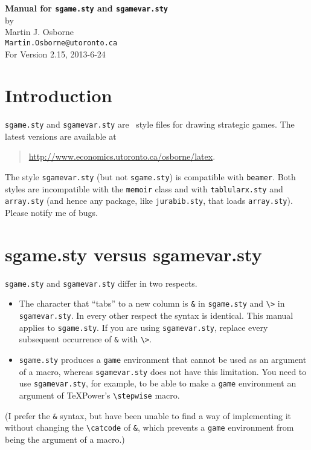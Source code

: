 \documentclass[12pt]{article}
\begin{document}
\renewcommand{\descriptionlabel}[1]{\hspace\labelsep
                                \normalfont #1\phantom{.}}

\begin{center}
{\bfseries Manual for {\tt sgame.sty} and {\tt sgamevar.sty}}\\
by\\
Martin J. Osborne\\
{\tt Martin.Osborne@utoronto.ca}\\
For Version 2.15, 2013-6-24
\end{center}

{\sloppy
\section{Introduction}
{\tt sgame.sty} and {\tt sgamevar.sty} are \LaTeXe\ style files for drawing
strategic games.  The latest versions are available at
\begin{verse}
\url{http://www.economics.utoronto.ca/osborne/latex}.
\end{verse}  The style
\texttt{sgamevar.sty} (but not \texttt{sgame.sty}) is compatible with
\texttt{beamer}.  Both styles are incompatible with the \texttt{memoir} class
and with \texttt{tablularx.sty} and \texttt{array.sty} (and hence any package,
like \texttt{jurabib.sty}, that loads \texttt{array.sty}).  Please notify me
of bugs.  
\section{sgame.sty versus sgamevar.sty}
\verb+sgame.sty+ and \verb+sgamevar.sty+ differ in two respects.
\begin{itemize}
   \item The character that ``tabs'' to a new column is \verb+&+ in
\verb+sgame.sty+ and \verb+\>+ in \verb+sgamevar.sty+.  In every other respect
the syntax is identical.  This manual applies to \verb+sgame.sty+.  If you are
using \verb+sgamevar.sty+, replace every subsequent occurrence of \verb+&+ with
\verb+\>+.
   \item \verb+sgame.sty+ produces a \verb+game+ environment that cannot be
used as an argument of a macro, whereas \verb+sgamevar.sty+ does not have this
limitation.  You need to use \verb+sgamevar.sty+, for example, to be able to
make a \verb+game+ environment an argument of TeXPower's \verb+\stepwise+
macro.
\end{itemize}

(I prefer the \verb+&+ syntax, but have been unable to find a way of
implementing it without changing the \verb+\catcode+ of \verb+&+, which
prevents a \verb+game+ environment from being the argument of a macro.)
}
\end{document}
